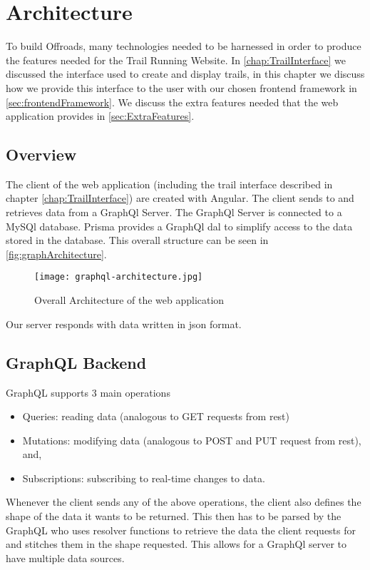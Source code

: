 \chapter{Architecture} \label{chap:Architecture}
To build Offroads, many technologies needed to be harnessed in order to produce the features needed for the Trail Running Website. In \autoref{chap:TrailInterface} we discussed the interface used to create and display trails, in this chapter we discuss how we provide this interface to the user with our chosen \Gls{frontend} framework in \autoref{sec:frontendFramework}. We discuss the extra features needed that the web application provides in \autoref{sec:ExtraFeatures}.

\section{Overview}
The client of the web application (including the trail interface described in chapter \ref{chap:TrailInterface}) are created with Angular. The client sends to and retrieves data from a GraphQl Server. The GraphQl Server is connected to a MySQl database. Prisma provides a GraphQl \acrfull{dal} to simplify access to the data stored in the database. This overall structure can be seen in \autoref{fig:graphArchitecture}.

\begin{figure}[htb!]
    \centering
    \texttt{[image: graphql-architecture.jpg]}
    \caption{Overall Architecture of the web application \cite{graphqlStructure}}
    \label{fig:graphArchitecture}
\end{figure}

Our server responds with data written in \acrfull{json} format.

\section{GraphQL Backend}
GraphQL supports 3 main operations
\begin{itemize}
    \item Queries: reading data (analogous to GET requests from \acrshort{rest})
    \item Mutations: modifying data (analogous to POST and PUT request from \acrshort{rest}), and,
    \item Subscriptions: subscribing to real-time changes to data.
\end{itemize}

Whenever the client sends any of the above operations, the client also defines the shape of the data it wants to be returned. This then has to be parsed by the GraphQL who uses resolver functions to retrieve the data the client requests for and stitches them in the shape requested. This allows for a GraphQl server to have multiple data sources.

